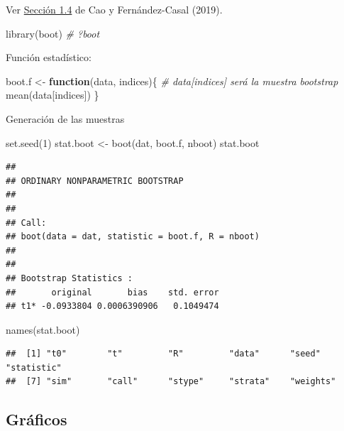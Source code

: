 \documentclass[
]{book}
\newenvironment{Shaded}{\begin{snugshade}}{\end{snugshade}}
\newcommand{\CommentTok}[1]{\textcolor[rgb]{0.56,0.35,0.01}{\textit{#1}}}
\newcommand{\ControlFlowTok}[1]{\textcolor[rgb]{0.13,0.29,0.53}{\textbf{#1}}}
\newcommand{\DecValTok}[1]{\textcolor[rgb]{0.00,0.00,0.81}{#1}}
\newcommand{\FunctionTok}[1]{\textcolor[rgb]{0.00,0.00,0.00}{#1}}
\newcommand{\NormalTok}[1]{#1}
\newcommand{\OtherTok}[1]{\textcolor[rgb]{0.56,0.35,0.01}{#1}}
\theoremstyle{break}
\theoremstyle{definition}
\theoremstyle{definition}
\theoremstyle{definition}
\theoremstyle{definition}
\theoremstyle{remark}
\begin{document}
Ver \href{https://rubenfcasal.github.io/book_remuestreo/cap1-paquetes.html}{Sección 1.4} de Cao y Fernández-Casal (2019).

\begin{Shaded}
\begin{Highlighting}[]
\FunctionTok{library}\NormalTok{(boot)}
\CommentTok{\# ?boot}
\end{Highlighting}
\end{Shaded}

Función estadístico:

\begin{Shaded}
\begin{Highlighting}[]
\NormalTok{boot.f }\OtherTok{\textless{}{-}} \ControlFlowTok{function}\NormalTok{(data, indices)\{}
  \CommentTok{\# data[indices] será la muestra bootstrap}
  \FunctionTok{mean}\NormalTok{(data[indices])}
\NormalTok{\}}
\end{Highlighting}
\end{Shaded}

Generación de las muestras

\begin{Shaded}
\begin{Highlighting}[]
\FunctionTok{set.seed}\NormalTok{(}\DecValTok{1}\NormalTok{)}
\NormalTok{stat.boot }\OtherTok{\textless{}{-}} \FunctionTok{boot}\NormalTok{(dat, boot.f, nboot)}
\NormalTok{stat.boot}
\end{Highlighting}
\end{Shaded}

\begin{verbatim}
## 
## ORDINARY NONPARAMETRIC BOOTSTRAP
## 
## 
## Call:
## boot(data = dat, statistic = boot.f, R = nboot)
## 
## 
## Bootstrap Statistics :
##       original       bias    std. error
## t1* -0.0933804 0.0006390906   0.1049474
\end{verbatim}

\begin{Shaded}
\begin{Highlighting}[]
\FunctionTok{names}\NormalTok{(stat.boot)}
\end{Highlighting}
\end{Shaded}

\begin{verbatim}
##  [1] "t0"        "t"         "R"         "data"      "seed"      "statistic"
##  [7] "sim"       "call"      "stype"     "strata"    "weights"
\end{verbatim}

\hypertarget{gruxe1ficos}{%
\subsection{Gráficos}\label{gruxe1ficos}}
\end{document}
